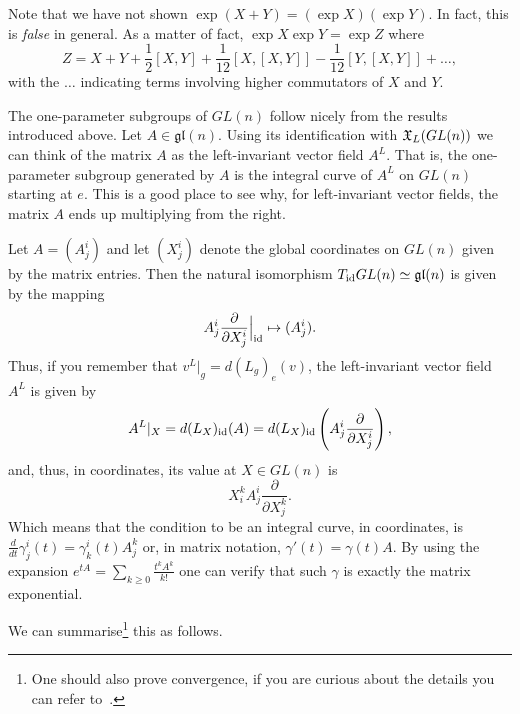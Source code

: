 \begin{remark}
	Note that we have not shown $\exp(X + Y) = (\exp X)(\exp Y)$.
	In fact, this is \emph{false} in general.
	As a matter of fact, $\exp X \exp Y = \exp Z$ where
	\begin{equation}
		Z = X + Y + \frac{1}2 [X,Y] + \frac1{12}[X,[X,Y]] - \frac1{12}[Y,[X,Y]] + \ldots,
	\end{equation}
	with the $\ldots$ indicating terms involving higher commutators of $X$ and $Y$.
\end{remark}

The one-parameter subgroups of $GL(n)$ follow nicely from the results introduced above.
Let $A\in\mathfrak{gl}(n)$. Using its identification with $\mathfrak{X}_L(GL(n))$ we can think of the matrix $A$ as the left-invariant vector field $A^L$.
That is, the one-parameter subgroup generated by $A$ is the integral curve of $A^L$ on $GL(n)$ starting at $e$.
This is a good place to see why, for left-invariant vector fields, the matrix $A$ ends up multiplying from the right.

Let $A = (A^i_j)$ and let $(X^i_j)$ denote the global coordinates on $GL(n)$ given by the matrix entries.
Then the natural isomorphism $T_{\operatorname{id}}GL(n) \simeq \mathfrak{gl}(n)$ is given by the mapping
\begin{equation}
	A^i_j \frac{\partial }{\partial X^i_j}\Big|_{\operatorname{id}} \mapsto (A^i_j).
\end{equation}
Thus, if you remember that $v^L|_g = d(L_g)_e(v)$, the left-invariant vector field $A^L$ is given by
\begin{equation}
	A^L|_X = d(L_X)_{\operatorname{id}}(A) = d(L_X)_{\operatorname{id}}\left(A^i_j \frac{\partial }{\partial X^i_j}\right),
\end{equation}
and, thus, in coordinates, its value at $X\in GL(n)$ is
\begin{equation}
	X^k_i A^i_j \frac{\partial }{\partial X^k_j}.
\end{equation}
Which means that the condition to be an integral curve, in coordinates, is $\frac{d}{dt}\gamma^i_j(t) = \gamma^i_k(t) A^k_j$ or, in matrix notation, $\gamma'(t) = \gamma(t) A$.
By using the expansion $e^{tA} = \sum_{k\geq 0} \frac{t^kA^k}{k!}$ one can verify that such $\gamma$ is exactly the matrix exponential.

We can summarise\footnote{One should also prove convergence, if you are curious about the details you can refer to~\cite[Proposition 20.2]{book:lee}.} this as follows.

